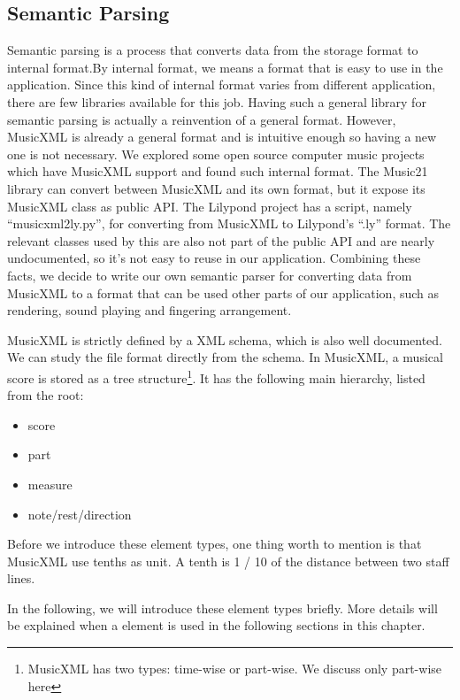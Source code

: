\subsection{Semantic Parsing}
Semantic parsing is a process that converts data from the storage format to internal format.By internal format, we means a format that is easy to use in the application. Since this kind of internal format varies from different application, there are few libraries available for this job. Having such a general library for semantic parsing is actually a reinvention of  a general format. However, MusicXML is already a general format and is intuitive enough so having a new one is not necessary. We explored some open source computer music projects which have MusicXML support and found such internal format. The Music21 library \citep{Music21}  can convert between MusicXML and its own format, but it expose its MusicXML class as public API. The Lilypond \citep{Lilypond} project has a script, namely ``musicxml2ly.py'', for converting from MusicXML to Lilypond's ``.ly'' format. The relevant classes used by this are also not part of the public API and are nearly undocumented, so it's not easy to reuse in our application. Combining these facts, we decide to write our own semantic parser for converting data from MusicXML to a format that can be used other parts of our application, such as rendering, sound playing and fingering arrangement. 

MusicXML is strictly defined by a XML schema, which is also well documented. We can study the file format directly from the schema. In MusicXML, a musical score is stored as a tree structure\footnote{MusicXML has two types: time-wise or part-wise. We discuss only part-wise here}. It has the following main hierarchy, listed from the root: 
\begin{itemize}
    \item score
    \item part
    \item measure
    \item note/rest/direction
\end{itemize}

Before we introduce these element types, one thing worth to mention is that MusicXML use tenths as unit. A tenth is 1 / 10 of the distance between two staff lines.

In the following, we will introduce these element types briefly. More details will be explained when a element is used in the following sections in this chapter.


